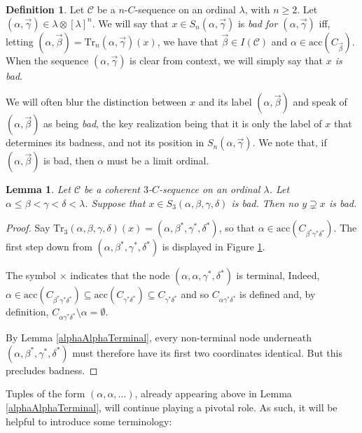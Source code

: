 \documentclass{amsart}
\numberwithin{theorem}{section}
\newtheorem{lemma}[theorem]{Lemma}
\theoremstyle{definition}
\newtheorem{definition}[theorem]{Definition}
\renewcommand{\subset}{\subseteq}
\newcommand{\acc}{\mathrm{acc}}
\newcommand{\C}{\mathcal{C}}
\newcommand{\Tr}{\mathrm{Tr}}
\begin{document}
\begin{definition}\label{bad}
Let $\C$ be a $n$-$C$-sequence on an ordinal $\lambda$, with $n\ge 2$. Let 
$(\alpha,\vec{\gamma}) \in \lambda \otimes [\lambda]^{n}$. We will say that $x\in S_n(\alpha,\vec\gamma)$ is \emph{bad for $(\alpha,\vec\gamma)$} iff, letting $(\alpha,\vec\beta)=\Tr_n(\alpha,\vec\gamma)(x)$, we have that $\vec \beta\in I(\C)$ and $\alpha\in\acc(C_{\vec\beta})$. When the sequence $(\alpha,\vec\gamma)$ is clear from context, we will simply say that \emph{$x$ is bad}.

We will often blur the distinction between $x$ and its label $(\alpha,\vec\beta)$ and speak of $(\alpha,\vec\beta)$ as being \emph{bad}, the key realization being that it is only the label of $x$ that determines its badness, and not its position in $S_n(\alpha,\vec\gamma)$. We note that, if 
$(\alpha,\vec{\beta})$ is bad, then $\alpha$ must be a limit ordinal.
\end{definition}

\begin{lemma}\label{badImmediate}
Let $\C$ be a coherent $3$-$C$-sequence on an ordinal $\lambda$. Let $\alpha\le\beta<\gamma<\delta<\lambda$. Suppose that $x\in S_3(\alpha,\beta,\gamma,\delta)$ is bad. Then no $y\supsetneq x$ is bad.
\end{lemma}

\begin{proof}
Say $\Tr_3(\alpha,\beta,\gamma,\delta)(x)=(\alpha,\beta^*,\gamma^*,\delta^*)$, so that $\alpha\in \acc(C_{\beta^*\gamma^*\delta^*})$. The first step down from $(\alpha,\beta^*,\gamma^*,\delta^*)$ is displayed in Figure \ref{first_step_bad}.
\begin{figure}[ht]
\caption{}
\label{first_step_bad}
\end{figure}
The symbol $\times$ indicates that the node $(\alpha,\alpha,\gamma^*,\delta^*)$ is terminal, Indeed, $\alpha\in \acc(C_{\beta^*\gamma^*\delta^*})\subset \acc(C_{\gamma^*\delta^*})\subset C_{\gamma^*\delta^*}$ and so $C_{\alpha\gamma^*\delta^*}$ is defined and, by definition, $C_{\alpha\gamma^*\delta^*}\setminus\alpha=\emptyset$.

By Lemma \ref{alphaAlphaTerminal}, every non-terminal node underneath $(\alpha,\beta^*,\gamma^*,\delta^*)$ must therefore have its first two coordinates identical. But this precludes badness.
\end{proof}

Tuples of the form $(\alpha,\alpha,\dots)$, already appearing above in Lemma \ref{alphaAlphaTerminal}, will continue playing a pivotal role. As such, it will be helpful to introduce some terminology:
\end{document}
